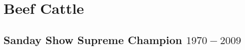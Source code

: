 \chapter{Beef Cattle}
\section[Supreme Champion]{Sanday Show Supreme Champion $1970 - 2009$}
\small

\normalsize
